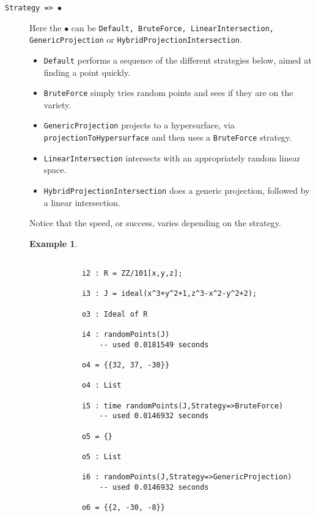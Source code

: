 \documentclass[11pt]{amsart}
\theoremstyle{definition}
\newtheorem{example}{Example}[section]
\begin{document}
\begin{description}		
	\item[\tt Strategy => $\bullet$]   Here the $\bullet$ can be {\tt Default, BruteForce, LinearIntersection, \\ GenericProjection} or {\tt HybridProjectionIntersection}.

	\begin{itemize}
		\item {\tt Default} performs a sequence of the different strategies below, aimed at finding a point quickly.    
		\item {\tt BruteForce} simply tries random points and sees if they are on the variety.
		
		\item {\tt GenericProjection} projects to a hypersurface, via 
		{\tt projectionToHypersurface} and then uses a {\tt BruteForce} strategy.
		
		\item {\tt LinearIntersection} intersects with an appropriately random linear space.
		
		\item {\tt HybridProjectionIntersection} does a generic projection, followed by a linear intersection. 		
	\end{itemize}

	Notice that the speed, or success, varies depending on the strategy.
\newpage

	\begin{example}\label{BruteForce}
		~~
		
		{{\small\color{blue}
		\begin{verbatim}

			i2 : R = ZZ/101[x,y,z];
			
			i3 : J = ideal(x^3+y^2+1,z^3-x^2-y^2+2);
			
			o3 : Ideal of R
			
			i4 : randomPoints(J)
				-- used 0.0181549 seconds

			o4 = {{32, 37, -30}}
			
			o4 : List
			
			i5 : time randomPoints(J,Strategy=>BruteForce)
				-- used 0.0146932 seconds

			o5 = {}
			
			o5 : List
			
			i6 : randomPoints(J,Strategy=>GenericProjection)
				-- used 0.0146932 seconds

			o6 = {{2, -30, -8}}
			

\end{verbatim}}}
\end{example}
\end{description}
\end{document}
